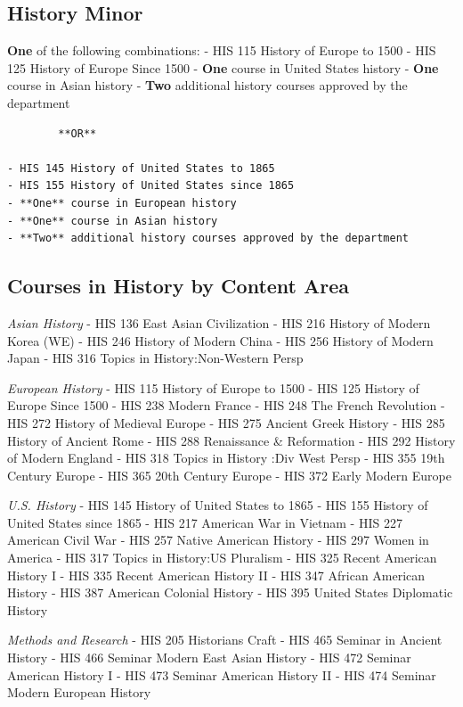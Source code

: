 \documentclass[
  letterpaper,
]{scrbook}
\begin{document}
\subsection{History Minor}\label{history-minor}

\textbf{One} of the following combinations: - HIS 115 History of Europe
to 1500 - HIS 125 History of Europe Since 1500 - \textbf{One} course in
United States history - \textbf{One} course in Asian history -
\textbf{Two} additional history courses approved by the department

\begin{verbatim}
        **OR**

- HIS 145 History of United States to 1865
- HIS 155 History of United States since 1865
- **One** course in European history
- **One** course in Asian history
- **Two** additional history courses approved by the department
\end{verbatim}

\subsection{Courses in History by Content
Area}\label{courses-in-history-by-content-area}

\emph{Asian History} - HIS 136 East Asian Civilization - HIS 216 History
of Modern Korea (WE) - HIS 246 History of Modern China - HIS 256 History
of Modern Japan - HIS 316 Topics in History:Non-Western Persp

\emph{European History} - HIS 115 History of Europe to 1500 - HIS 125
History of Europe Since 1500 - HIS 238 Modern France - HIS 248 The
French Revolution - HIS 272 History of Medieval Europe - HIS 275 Ancient
Greek History - HIS 285 History of Ancient Rome - HIS 288 Renaissance \&
Reformation - HIS 292 History of Modern England - HIS 318 Topics in
History :Div West Persp - HIS 355 19th Century Europe - HIS 365 20th
Century Europe - HIS 372 Early Modern Europe

\emph{U.S. History} - HIS 145 History of United States to 1865 - HIS 155
History of United States since 1865 - HIS 217 American War in Vietnam -
HIS 227 American Civil War - HIS 257 Native American History - HIS 297
Women in America - HIS 317 Topics in History:US Pluralism - HIS 325
Recent American History I - HIS 335 Recent American History II - HIS 347
African American History - HIS 387 American Colonial History - HIS 395
United States Diplomatic History

\emph{Methods and Research} - HIS 205 Historians Craft - HIS 465 Seminar
in Ancient History - HIS 466 Seminar Modern East Asian History - HIS 472
Seminar American History I - HIS 473 Seminar American History II - HIS
474 Seminar Modern European History
\end{document}
